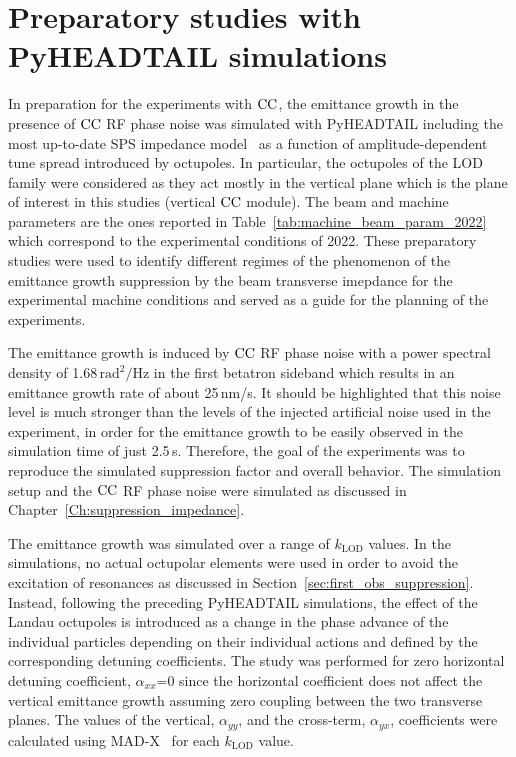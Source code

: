 \section{Preparatory studies with PyHEADTAIL simulations}\label{sec:preparatory_studies_2022_cc}

In preparation for the experiments with ${\mathrm{CC}}$, the emittance growth in the presence of ${\mathrm{CC}}$ RF phase noise was simulated with PyHEADTAIL including the most up-to-date SPS impedance model~\cite{updated_sps_wakfields_model} as a function of amplitude-dependent tune spread introduced by octupoles. In particular, the octupoles of the LOD family were considered as they act mostly in the vertical plane which is the plane of interest in this studies (vertical ${\mathrm{CC}}$ module). The beam and machine parameters are the ones reported in Table~\ref{tab:machine_beam_param_2022} which correspond to the experimental conditions of 2022. These preparatory studies were used to identify different regimes of the phenomenon of the emittance growth suppression by the beam transverse imepdance for the experimental machine conditions and served as a guide for the planning of the experiments.

The emittance growth is induced by ${\mathrm{CC}}$ RF phase noise with a power spectral density of 1.68\,$\mathrm{rad^2/Hz}$ in the first betatron sideband which results in an emittance growth rate of about 25\,nm/s. It should be highlighted that this noise level is much stronger than the levels of the injected artificial noise used in the experiment, in order for the emittance growth to be easily observed in the simulation time of just 2.5\,s. Therefore, the goal of the experiments was to reproduce the simulated suppression factor and overall behavior. The simulation setup and the ${\mathrm{CC}}$ RF phase noise were simulated as discussed in Chapter~\ref{Ch:suppression_impedance}. 

The emittance growth was simulated over a range of $k_\mathrm{LOD}$ values. In the simulations, no actual octupolar elements were used in order to avoid the excitation of resonances as discussed in Section~\ref{sec:first_obs_suppression}. Instead, following the preceding PyHEADTAIL simulations, the effect of the Landau octupoles is introduced as a change in the phase advance of the individual particles depending on their individual actions and defined by the corresponding detuning coefficients. The study was performed for zero horizontal detuning coefficient, $\alpha_{xx}$=0 since the horizontal coefficient does not affect the vertical emittance growth assuming zero coupling between the two transverse planes. The values of the vertical, $\alpha_{yy}$, and the cross-term, $\alpha_{yx}$, coefficients were calculated using MAD-X~\cite{madx} for each $k_\mathrm{LOD}$ value.

